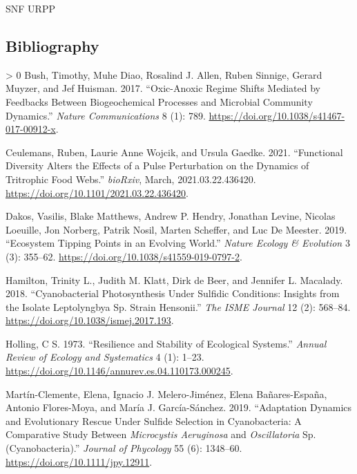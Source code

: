 \documentclass{article}
\newlength{\cslhangindent}
\newenvironment{CSLReferences}[3] %
 {%
  \setlength{\parindent}{0pt}
  \ifodd #1 \everypar{\setlength{\hangindent}{\cslhangindent}}\ignorespaces\fi
  \ifnum #2 > 0
  \setlength{\parskip}{#2\baselineskip}
  \fi
 }%
 {}
\begin{document}
SNF URPP

\hypertarget{bibliography}{%
\subsection*{Bibliography}\label{bibliography}}

\hypertarget{refs}{}
\begin{CSLReferences}{1}{0}
\leavevmode\hypertarget{ref-bush2017}{}%
Bush, Timothy, Muhe Diao, Rosalind J. Allen, Ruben Sinnige, Gerard
Muyzer, and Jef Huisman. 2017. {``Oxic-Anoxic Regime Shifts Mediated by
Feedbacks Between Biogeochemical Processes and Microbial Community
Dynamics.''} \emph{Nature Communications} 8 (1): 789.
\url{https://doi.org/10.1038/s41467-017-00912-x}.

\leavevmode\hypertarget{ref-ceulemans2021}{}%
Ceulemans, Ruben, Laurie Anne Wojcik, and Ursula Gaedke. 2021.
{``Functional Diversity Alters the Effects of a Pulse Perturbation on
the Dynamics of Tritrophic Food Webs.''} \emph{bioRxiv}, March,
2021.03.22.436420. \url{https://doi.org/10.1101/2021.03.22.436420}.

\leavevmode\hypertarget{ref-dakos2019b}{}%
Dakos, Vasilis, Blake Matthews, Andrew P. Hendry, Jonathan Levine,
Nicolas Loeuille, Jon Norberg, Patrik Nosil, Marten Scheffer, and Luc De
Meester. 2019. {``Ecosystem Tipping Points in an Evolving World.''}
\emph{Nature Ecology \& Evolution} 3 (3): 355--62.
\url{https://doi.org/10.1038/s41559-019-0797-2}.

\leavevmode\hypertarget{ref-hamilton2018}{}%
Hamilton, Trinity L., Judith M. Klatt, Dirk de Beer, and Jennifer L.
Macalady. 2018. {``Cyanobacterial Photosynthesis Under Sulfidic
Conditions: Insights from the Isolate Leptolyngbya Sp. Strain
Hensonii.''} \emph{The ISME Journal} 12 (2): 568--84.
\url{https://doi.org/10.1038/ismej.2017.193}.

\leavevmode\hypertarget{ref-holling1973}{}%
Holling, C S. 1973. {``Resilience and Stability of Ecological
Systems.''} \emph{Annual Review of Ecology and Systematics} 4 (1):
1--23. \url{https://doi.org/10.1146/annurev.es.04.110173.000245}.

\leavevmode\hypertarget{ref-martuxednclemente2019}{}%
Martín-Clemente, Elena, Ignacio J. Melero-Jiménez, Elena Bañares-España,
Antonio Flores-Moya, and María J. García-Sánchez. 2019. {``Adaptation
Dynamics and Evolutionary Rescue Under Sulfide Selection in
Cyanobacteria: A Comparative Study Between {\emph{Microcystis
Aeruginosa}} and {\emph{Oscillatoria}} Sp. (Cyanobacteria).''}
\emph{Journal of Phycology} 55 (6): 1348--60.
\url{https://doi.org/10.1111/jpy.12911}.


\end{CSLReferences}
\end{document}
